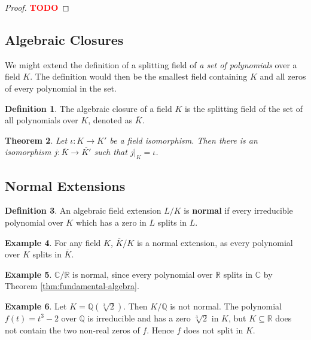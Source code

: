 \documentclass[12pt]{article}
\newtheorem{theorem}{Theorem}
\theoremstyle{definition}
\newtheorem{definition}[theorem]{Definition}
\newtheorem{example}[theorem]{Example}
\newcommand{\Q}{\mathbb Q}
\newcommand{\C}{\mathbb C}
\newcommand{\R}{\mathbb R}
\newcommand{\TODO}{\textbf{\textcolor{red}{TODO}}}
\begin{document}
\begin{proof}
	\TODO
\end{proof}


\subsection{Algebraic Closures}
We might extend the definition of a splitting field of \textit{a set of polynomials} over a field $K$. The definition would then be the smallest field containing $K$ and all zeros of every polynomial in the set. 
\begin{definition}
    The algebraic closure of a field $K$ is the splitting field of the set of all polynomials over $K$, denoted as $\overline K$. 
\end{definition}


\begin{theorem} 
	Let $\iota: K \to K'$ be a field isomorphism. Then there is an isomorphism $j: \overline K \to \overline {K'}$ such that $j |_K = \iota$. 
\end{theorem}

%



\subsection{Normal Extensions}


\begin{definition}
    An algebraic field extension $L/ K$ is \textbf{normal} if every irreducible polynomial over $K$ which has a zero in $L$ splits in $L$. 
\end{definition}
\begin{example}
	For any field $K$, $\overline K / K$ is a normal extension, as every polynomial over $K$ splits in $\overline K$. 
\end{example}
\begin{example}
    $\C / \R$ is normal, since every polynomial over $\R$ splits in $\C$ by Theorem \ref{thm:fundamental-algebra}.
\end{example}
\begin{example}
    Let $K = \Q(\sqrt[3]{2})$. Then $K / \Q$ is not normal. The polynomial $f(t) = t^3 - 2$ over $\Q$ is irreducible and has a zero $\sqrt[3]{2}$ in $K$, but $K \subseteq \R$ does not contain the two non-real zeros of $f$. Hence $f$ does not split in $K$.
\end{example}
\end{document}
